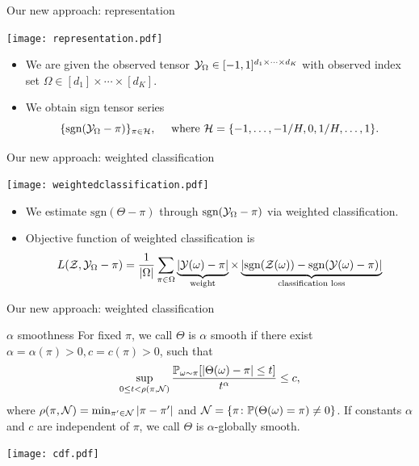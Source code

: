\documentclass[10pt, mathserif]{beamer} %
\theoremstyle{definition}
\theoremstyle{plain}
\begin{document}
\begin{frame}{Our new approach: representation}
  \begin{center}
    \texttt{[image: representation.pdf]}
    \end{center}
\begin{itemize}
    \item We are given the observed tensor $\mathcal{Y}_\Omega\in[-1,1]^{d_1\times \cdots\times d_K}$ with observed index set $\Omega\in[d_1]\times\cdots\times[d_K]$.
    \item We obtain sign tensor series \[\{\text{sgn}(\mathcal{Y}_\Omega-\pi)\}_{\pi\in\mathcal{H}},\quad \text{ where } \mathcal{H}= \{-1,\ldots,-1/H,0,1/H,\ldots,1\}.\]
\end{itemize}
    
\end{frame}
\begin{frame}{Our new approach: weighted classification}
    \begin{center}
    \texttt{[image: weightedclassification.pdf]}
    \end{center}
    \begin{itemize}
    \item We estimate $\text{sgn}(\Theta-\pi)$ through $\text{sgn}(\mathcal{Y}_\Omega-\pi)$ via weighted classification.
    \item Objective function of weighted classification is
    \begin{align}
    L(\mathcal{Z},\mathcal{Y}_\Omega-\pi) = \frac{1}{|\Omega|}\sum_{\pi\in\Omega}\underbrace{|\mathcal{Y}(\omega)-\pi|}_{\text{weight}}\times\underbrace{ |\text{sgn}(\mathcal{Z}(\omega))-\text{sgn}(\mathcal{Y}(\omega)-\pi)|}_{\text{classification loss}}
    \end{align}
    \end{itemize}
\end{frame}


\begin{frame}{Our new approach: weighted classification}
\begin{block}{$\alpha$ smoothness}
For fixed $\pi$, we call $\Theta$ is $\alpha$ smooth if there exist $\alpha = \alpha(\pi)>0,c = c(\pi)>0$, such that 
\begin{align}
    \sup_{0\leq t<\rho(\pi,\mathcal{N})}{\mathbb{P}_{\omega\sim\pi}[|\Theta(\omega)-\pi|\leq t]\over t^\alpha}\leq c,
\end{align}
where $\rho(\pi,\mathcal{N}) = \min_{\pi'\in\mathcal{N}}|\pi-\pi'|$ and $\mathcal{N} = \{\pi\colon\mathbb{P}(\Theta(\omega) = \pi)\neq 0\}$.
If constants $\alpha$ and $c$ are independent of $\pi$, we call $\Theta$ is $\alpha$-globally smooth.
\end{block}
 \begin{center}
 \texttt{[image: cdf.pdf]}
 \end{center}
\end{frame}
\end{document}

